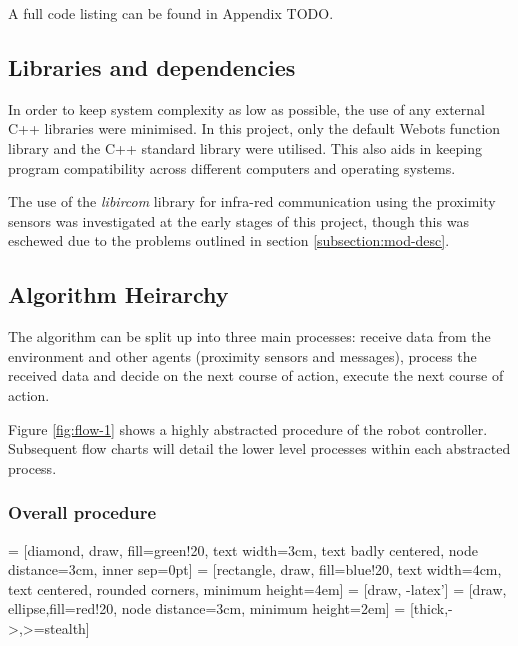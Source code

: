 A full code listing can be found in Appendix TODO.

\subsection{Libraries and dependencies}

In order to keep system complexity as low as possible, the use of any external C++ libraries were minimised. In this project, only the default Webots function library and the C++ standard library were utilised. This also aids in keeping program compatibility across different computers and operating systems.

The use of the \textit{libircom} library for infra-red communication using the proximity sensors was investigated at the early stages of this project, though this was eschewed due to the problems outlined in section \ref{subsection:mod-desc}.
\clearpage

\subsection{Algorithm Heirarchy}

The algorithm can be split up into three main processes: receive data from the environment and other agents (proximity sensors and messages), process the received data and decide on the next course of action, execute the next course of action. 

Figure \ref{fig:flow-1} shows a highly abstracted procedure of the robot controller. Subsequent flow charts will detail the lower level processes within each abstracted process.

\subsubsection{Overall procedure}

 = [diamond, draw, fill=green!20, 
text width=3cm, text badly centered, node distance=3cm, inner sep=0pt]
 = [rectangle, draw, fill=blue!20, 
text width=4cm, text centered, rounded corners, minimum height=4em]
 = [draw, -latex']
 = [draw, ellipse,fill=red!20, node distance=3cm,
minimum height=2em]
 = [thick,->,>=stealth]

